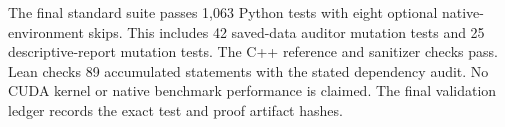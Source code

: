 The final standard suite passes 1,063 Python tests with eight optional native-environment skips. This includes 42 saved-data auditor mutation tests and 25 descriptive-report mutation tests. The C++ reference and sanitizer checks pass. Lean checks 89 accumulated statements with the stated dependency audit. No CUDA kernel or native benchmark performance is claimed. The final validation ledger records the exact test and proof artifact hashes.
